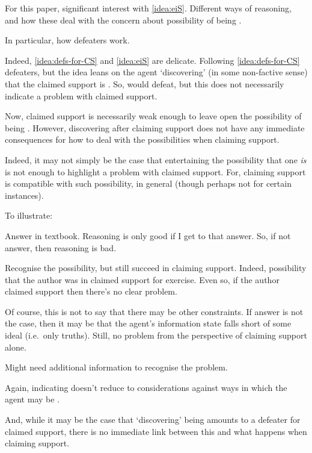 \begin{note}
  For this paper, significant interest with \autoref{idea:eiS}.
  Different ways of reasoning, and how these deal with the concern about possibility of being \mom{}.

  In particular, how defeaters work.

  Indeed, \autoref{idea:defs-for-CS} and \autoref{idea:eiS} are delicate.
  Following \autoref{idea:defs-for-CS} defeaters, but the idea leans on the agent `discovering' (in some non-factive sense) that the claimed support is \mom{}.
  So, would defeat, but this does not necessarily indicate a problem with claimed support.

  Now, claimed support is necessarily weak enough to leave open the possibility of being \mom{}.
  However, discovering after claiming support does not have any immediate consequences for how to deal with the possibilities when claiming support.

  Indeed, it may not simply be the case that entertaining the possibility that one \emph{is} \mom{} is not enough to highlight a problem with claimed support.
  For, claiming support is compatible with such possibility, in general (though perhaps not for certain instances).

  To illustrate:

  \begin{illustration}
    Answer in textbook.
    Reasoning is only good if I get to that answer.
    So, if not answer, then reasoning is bad.
  \end{illustration}

  Recognise the possibility, but still succeed in claiming support.
  Indeed, possibility that the author was \mom{} in claimed support for exercise.
  Even so, if the author claimed support then there's no clear problem.

  Of course, this is not to say that there may be other constraints.
  If answer is not the case, then it may be that the agent's information state falls short of some ideal (i.e.\ only truths).
  Still, no problem from the perspective of claiming support alone.

  Might need additional information to recognise the problem.

  Again, indicating doesn't reduce to considerations against ways in which the agent may be \mom{}.

  And, while it may be the case that `discovering' being \mom{} amounts to a defeater for claimed support, there is no immediate link between this and what happens when claiming support.
\end{note}

